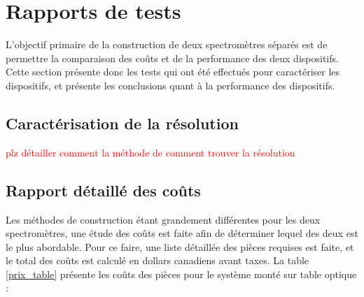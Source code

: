 \documentclass[11pt,letterpaper]{article}
\begin{document}
\section{Rapports de tests}

L'objectif primaire de la construction de deux spectromètres séparés est de permettre la 
comparaison des coûts et de la performance des deux dispositifs. Cette section présente
donc les tests qui ont été effectués pour caractériser les dispositifs, et présente les 
conclusions quant à la performance des dispositifs.

\subsection{Caractérisation de la résolution}

\textcolor{red}{plz détailler comment la méthode de comment trouver la résolution}

\subsection{Rapport détaillé des coûts}

Les méthodes de construction étant grandement différentes pour les deux spectromètres, une 
étude des coûts est faite afin de déterminer lequel des deux est le plus abordable. Pour ce
faire, une liste détaillée des pièces requises est faite, et le total des coûts est calculé en
dollars canadiens avant taxes. La table \ref{prix_table} présente les coûts des pièces pour
le système monté sur table optique :
\end{document}
